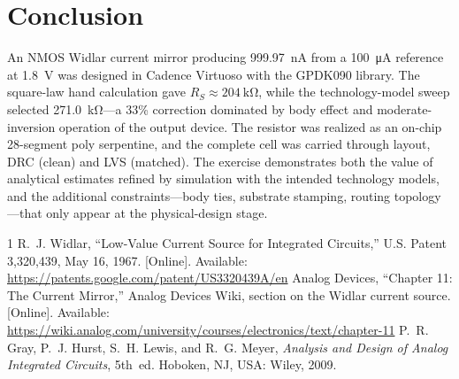 \documentclass[conference]{IEEEtran}
\begin{document}
\section{Conclusion}
An NMOS Widlar current mirror producing \SI{999.97}{\nano\ampere} from a
\SI{100}{\micro\ampere} reference at \SI{1.8}{\volt} was designed in Cadence
Virtuoso with the GPDK090 library. The square-law hand calculation gave
$R_S\approx\SI{204}{\kilo\ohm}$, while the technology-model sweep selected
\SI{271.0}{\kilo\ohm}---a 33\% correction dominated by body effect and
moderate-inversion operation of the output device. The resistor was realized
as an on-chip 28-segment poly serpentine, and the complete cell was carried
through layout, DRC (clean) and LVS (matched). The exercise demonstrates both
the value of analytical estimates refined by simulation with the intended
technology models, and the additional constraints---body ties, substrate
stamping, routing topology---that only appear at the physical-design stage.

\begin{thebibliography}{1}
R.~J. Widlar, ``Low-Value Current Source for Integrated Circuits,'' U.S.
Patent 3,320,439, May 16, 1967. [Online]. Available:
\url{https://patents.google.com/patent/US3320439A/en}
Analog Devices, ``Chapter 11: The Current Mirror,'' Analog Devices Wiki,
section on the Widlar current source. [Online]. Available:
\url{https://wiki.analog.com/university/courses/electronics/text/chapter-11}
P.~R. Gray, P.~J. Hurst, S.~H. Lewis, and R.~G. Meyer, \emph{Analysis and
Design of Analog Integrated Circuits}, 5th~ed. Hoboken, NJ, USA: Wiley, 2009.
\end{thebibliography}
\end{document}
